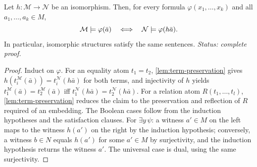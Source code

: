 \begin{lemma}
\label{lem:iso-invariance}
Let \(h:\mathcal M\to\mathcal N\) be an isomorphism.  Then, for every
formula \(\varphi(x_1,\ldots,x_k)\) and all \(a_1,\ldots,a_k\in M\),
\[
  \mathcal M\models\varphi(\bar a)
  \quad\Longleftrightarrow\quad
  \mathcal N\models\varphi(h\bar a).
\]
In particular, isomorphic structures satisfy the same sentences.
\textit{Status: complete proof.}
\end{lemma}
\begin{proof}
Induct on \(\varphi\).  For an equality atom \(t_1=t_2\),
\cref{lem:term-preservation} gives
\(h(t_i^{\mathcal M}(\bar a))=t_i^{\mathcal N}(h\bar a)\) for both terms,
and injectivity of \(h\) yields
\(t_1^{\mathcal M}(\bar a)=t_2^{\mathcal M}(\bar a)\) iff
\(t_1^{\mathcal N}(h\bar a)=t_2^{\mathcal N}(h\bar a)\).  For a relation
atom \(R(t_1,\ldots,t_l)\), \cref{lem:term-preservation} reduces the claim
to the preservation and reflection of \(R\) required of an embedding.
The Boolean cases follow from the induction hypotheses and the
satisfaction clauses.  For \(\exists y\,\psi\): a witness \(a'\in M\) on
the left maps to the witness \(h(a')\) on the right by the induction
hypothesis; conversely, a witness \(b\in N\) equals \(h(a')\) for some
\(a'\in M\) by surjectivity, and the induction hypothesis returns the
witness \(a'\).  The universal case is dual, using the same surjectivity.
\end{proof}

